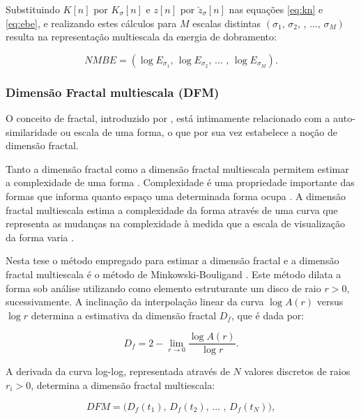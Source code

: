 Substituindo $K[n]$ por $K_{\sigma}[n]$ e $z[n]$ por $\breve{z}_{\sigma}[n]$ nas equações \ref{eq:kn} e \ref{eq:ebe}, e realizando estes cálculos para $M$ escalas distintas $(\sigma_1\text{, }\sigma_2\text{, }\text{, }\ldots\text{, }\sigma_M)$ resulta na representação multiescala da energia de dobramento:

\begin{equation}
NMBE = (\log{E_{\sigma_{1}}}\text{, }\log{E_{\sigma_{2}}}\text{, }\ldots \text{ , }\log{E_{\sigma_{M}}})\text{.}
\label{eq:nmbe}
\end{equation}

\subsubsection*{Dimensão Fractal multiescala (DFM)}

O conceito de fractal, introduzido por , está intimamente relacionado com a auto-similaridade ou escala de uma forma, o que por sua vez estabelece a noção de dimensão fractal.

Tanto a dimensão fractal como a dimensão fractal multiescala permitem estimar a complexidade de uma forma \cite{Backes:2012}. Complexidade é uma propriedade importante das formas que informa quanto espaço uma determinada forma ocupa \cite{Costa:2009}. A dimensão fractal multiescala estima a complexidade da forma através de uma curva que representa as mudanças na complexidade à medida que a escala de visualização da forma varia \cite{Florindo:2012}.

Nesta tese o método empregado para estimar a dimensão fractal e a dimensão fractal multiescala é o método de Minkowski-Bouligand \cite{Costa:2009}. Este método dilata a forma sob análise utilizando como elemento estruturante um disco de raio $r > 0$, sucessivamente. A inclinação da interpolação linear da curva $\log{A(r)}$ versus $\log{r}$ determina a estimativa da dimensão fractal $D_f$, que é dada por:

\begin{equation}
D_f = 2 - \lim_{r \to 0}  \frac{\log{A(r)}}{\log{r}}.
\label{eq:df}
\end{equation}

A derivada da curva log-log, representada através de $N$ valores discretos de raios $r_i>0$, determina a dimensão fractal multiescala:

\begin{equation}
DFM = \big(D_f(t_1)\text{, }D_f(t_2)\text{, }\ldots\text{ , }D_f(t_N)\big), 
\label{eq:dfm}
\end{equation}

